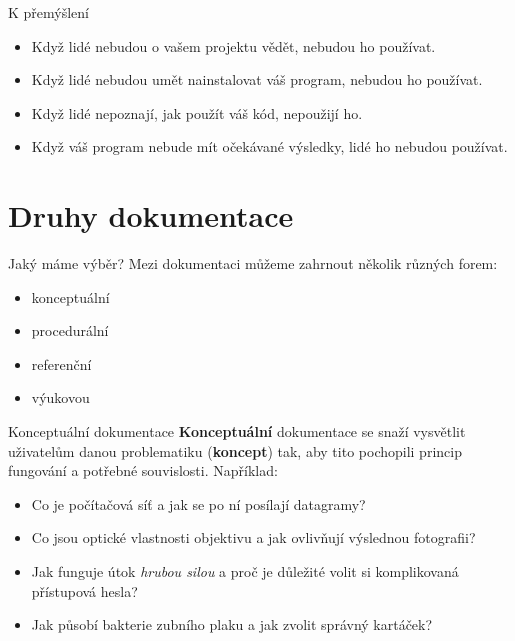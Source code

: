 \documentclass[12pt,a4paper]{beamer}
\begin{document}
		\begin{frame}{K přemýšlení}
			\begin{itemize}
			\item Když lidé nebudou o vašem projektu vědět, nebudou ho používat.
			\item Když lidé nebudou umět nainstalovat váš program, nebudou ho používat.
			\item Když lidé nepoznají, jak použít váš kód, nepoužijí ho.
			\item Když váš program nebude mít očekávané výsledky, lidé ho nebudou používat.
			\end{itemize}
		\end{frame}
	
    
    \section{Druhy dokumentace}
    
    	\begin{frame}{Jaký máme výběr?}
    	Mezi dokumentaci můžeme zahrnout několik různých forem:
    	\begin{itemize}
    		\item konceptuální 
    		\item procedurální 
    		\item referenční
    		\item výukovou
    	\end{itemize}
		\end{frame}
	
		\begin{frame}{Konceptuální dokumentace}
		\textbf{Konceptuální} dokumentace se snaží vysvětlit uživatelům danou problematiku (\textbf{koncept}) tak, aby tito pochopili princip fungování a potřebné souvislosti. Například:
		
		\begin{itemize}
			\item Co je počítačová síť a jak se po ní posílají datagramy?
			\item Co jsou optické vlastnosti objektivu a jak ovlivňují výslednou fotografii?
			\item Jak funguje útok \textit{hrubou silou} a proč je důležité volit si komplikovaná přístupová hesla?
			\item Jak působí bakterie zubního plaku a jak zvolit správný kartáček?
		\end{itemize}
		\end{frame}
	
\end{document}

